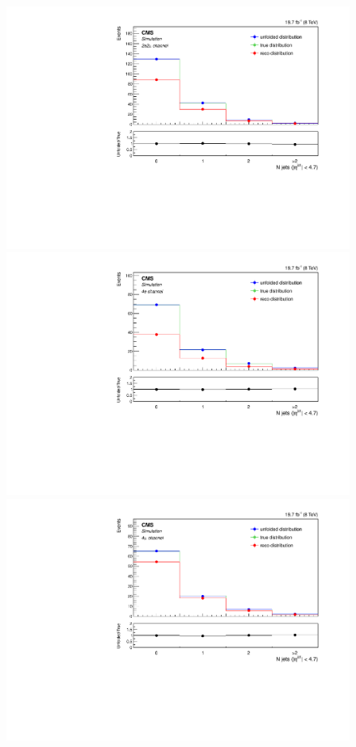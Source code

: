 \begin{figure}[hbtp]
\begin{center}
    \includegraphics[width=0.8\cmsFigWidth]{Figures/Unfolding/MCTests/Jets_ZZTo2e2m_MadMatrix_PowDistr_FullSample_fr}
     \includegraphics[width=0.8\cmsFigWidth]{Figures/Unfolding/MCTests/Jets_ZZTo4e_PowMatrix_MadDistr_FullSample_fr}     
    \includegraphics[width=0.8\cmsFigWidth]{Figures/Unfolding/MCTests/Jets_ZZTo4m_PowMatrix_MadDistr_FullSample_fr}     

\end{center}
\end{figure}
